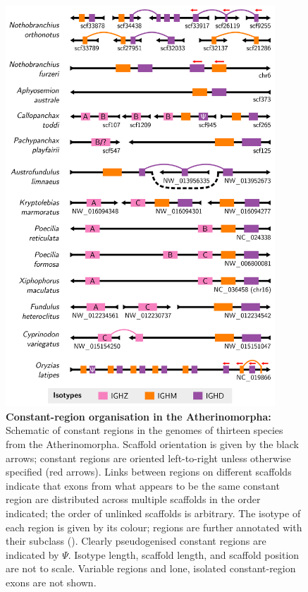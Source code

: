 \begin{figure}
\centering
\includegraphics[width=0.9\textwidth]{_Figures/png_edited/multispecies-ch-regions}
\caption[Constant-region organisation in the Atherinomorpha]{\textbf{Constant-region organisation in the Atherinomorpha:}
Schematic of \igh{} constant regions in the genomes of thirteen species from the Atherinomorpha. Scaffold orientation is given by the black arrows; constant regions are oriented left-to-right unless otherwise specified (red arrows). Links between regions on different scaffolds indicate that exons from what appears to be the same constant region are distributed across multiple scaffolds in the order indicated; the order of unlinked scaffolds is arbitrary. The isotype of each region is given by its colour;  regions are further annotated with their subclass (). Clearly pseudogenised constant regions are indicated by $\Psi$. Isotype length, scaffold length, and scaffold position are not to scale. Variable regions and lone, isolated constant-region exons are not shown.}
\label{fig:multispecies-ch-regions}
\end{figure}

